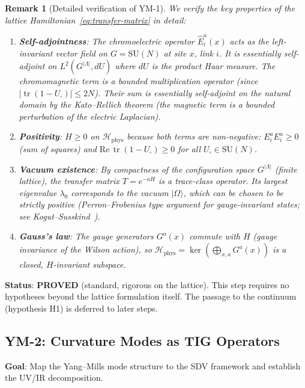 \documentclass[11pt]{article}
\newtheorem{remark}[theorem]{Remark}
\DeclareMathOperator{\tr}{tr}
\begin{document}
\begin{remark}[Detailed verification of YM-1]
\label{rem:ym1-detail}
We verify the key properties of the lattice Hamiltonian~\eqref{eq:transfer-matrix}
in detail:
\begin{enumerate}
  \item \textbf{Self-adjointness}: The chromoelectric operator
    $\hat{E}_i^a(x)$ acts as the left-invariant vector field on
    $G = \mathrm{SU}(N)$ at site $x$, link $i$.  It is essentially
    self-adjoint on $L^2(G^{|\Lambda|}, dU)$ where $dU$ is the product
    Haar measure.  The chromomagnetic term is a bounded multiplication
    operator (since $|\tr(1 - U_\square)| \leq 2N$).  Their sum is
    essentially self-adjoint on the natural domain by the Kato--Rellich
    theorem (the magnetic term is a bounded perturbation of the electric
    Laplacian).
  \item \textbf{Positivity}: $H \geq 0$ on $\mathcal{H}_{\mathrm{phys}}$
    because both terms are non-negative: $E_i^a E_i^a \geq 0$ (sum of
    squares) and $\mathrm{Re}\,\tr(1 - U_\square) \geq 0$ for all
    $U_\square \in \mathrm{SU}(N)$.
  \item \textbf{Vacuum existence}: By compactness of the configuration
    space $G^{|\Lambda|}$ (finite lattice), the transfer matrix
    $T = e^{-aH}$ is a trace-class operator.  Its largest eigenvalue
    $\lambda_0$ corresponds to the vacuum $|\Omega\rangle$, which can
    be chosen to be strictly positive (Perron--Frobenius type argument
    for gauge-invariant states; see Kogut--Susskind~\cite{KS}).
  \item \textbf{Gauss's law}: The gauge generators $G^a(x)$ commute
    with $H$ (gauge invariance of the Wilson action), so
    $\mathcal{H}_{\mathrm{phys}} = \ker(\bigoplus_{x,a} G^a(x))$ is
    a closed, $H$-invariant subspace.
\end{enumerate}
\end{remark}

\textbf{Status}: \textbf{PROVED} (standard, rigorous on the lattice).
This step requires no hypotheses beyond the lattice formulation itself.
The passage to the continuum (hypothesis H1) is deferred to later steps.

\subsection{YM-2: Curvature Modes as TIG Operators}
\label{sec:ym2}

\textbf{Goal}: Map the Yang--Mills mode structure to the SDV
framework and establish the UV/IR decomposition.
\end{document}
